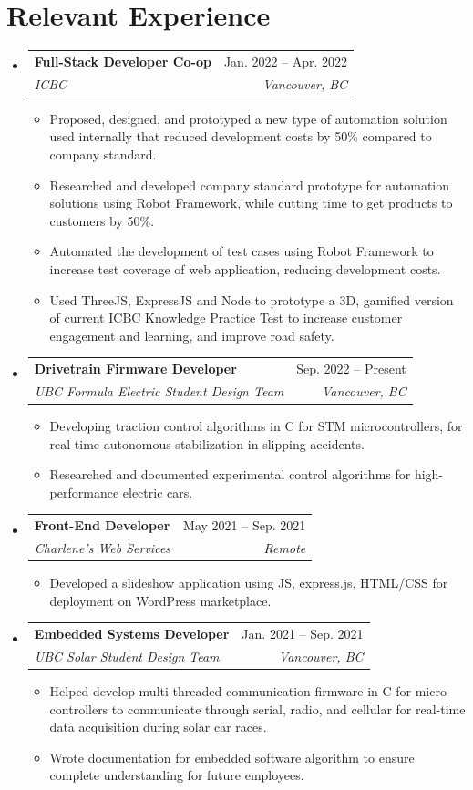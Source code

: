 \documentclass[letterpaper,11pt]{article}
\makeatletter
\newcommand{\resumeItem}[1]{
  \item\small{
    {#1 \vspace{-2pt}}
  }
}
\newcommand{\resumeSubheading}[4]{
  \vspace{-2pt}\item
    \begin{tabular*}{0.97\textwidth}[t]{l@{\extracolsep{\fill}}r}
      \textbf{#1} & #2 \\
      \textit{\small#3} & \textit{\small #4} \\
    \end{tabular*}\vspace{-7pt}
}
\newcommand{\resumeSubHeadingListStart}{\begin{itemize}[leftmargin=0.15in, label={}]}
\newcommand{\resumeSubHeadingListEnd}{\end{itemize}}
\newcommand{\resumeItemListStart}{\begin{itemize}}
\newcommand{\resumeItemListEnd}{\end{itemize}\vspace{-5pt}}
\makeatother
\begin{document}
\section{Relevant Experience}
  \resumeSubHeadingListStart
  \resumeSubheading
      {Full-Stack Developer Co-op}{Jan. 2022 -- Apr. 2022}
      {ICBC}{Vancouver, BC}
      \resumeItemListStart
        \resumeItem{Proposed, designed, and prototyped a new type of automation solution used internally that reduced development costs by 50\% compared to company standard.}
        \resumeItem{Researched and developed company standard prototype for automation solutions using Robot Framework, while cutting time to get products to customers by 50\%.}
        \resumeItem{Automated the development of test cases using Robot Framework to increase test coverage of web application, reducing development costs.}
        \resumeItem{Used ThreeJS, ExpressJS and Node to prototype a 3D, gamified version of current ICBC Knowledge Practice Test to increase customer engagement and learning, and improve road safety.}
      \resumeItemListEnd
  \resumeSubheading
      {Drivetrain Firmware Developer}{Sep. 2022 -- Present}
      {UBC Formula Electric Student Design Team}{Vancouver, BC}
      \resumeItemListStart
        \resumeItem{Developing traction control algorithms in C for STM microcontrollers, for real-time autonomous stabilization in slipping accidents.}
        \resumeItem{Researched and documented experimental control algorithms for high-performance electric cars.}
      \resumeItemListEnd


    \resumeSubheading
      {Front-End Developer}{May 2021 -- Sep. 2021}
      {Charlene's Web Services}{Remote}
      \resumeItemListStart
        \resumeItem{Developed a slideshow application using JS, express.js, HTML/CSS for deployment on WordPress marketplace.}

      \resumeItemListEnd
      
      
    \resumeSubheading
      {Embedded Systems Developer}{Jan. 2021 -- Sep. 2021}
      {UBC Solar Student Design Team}{Vancouver, BC}
      \resumeItemListStart
        \resumeItem{Helped develop multi-threaded communication firmware in C for micro-controllers to communicate through serial, radio, and cellular for real-time data acquisition during solar car races.}
        \resumeItem{Wrote documentation for embedded software algorithm to ensure complete understanding for future employees.}
        
      \resumeItemListEnd

      
  \resumeSubHeadingListEnd
\end{document}
